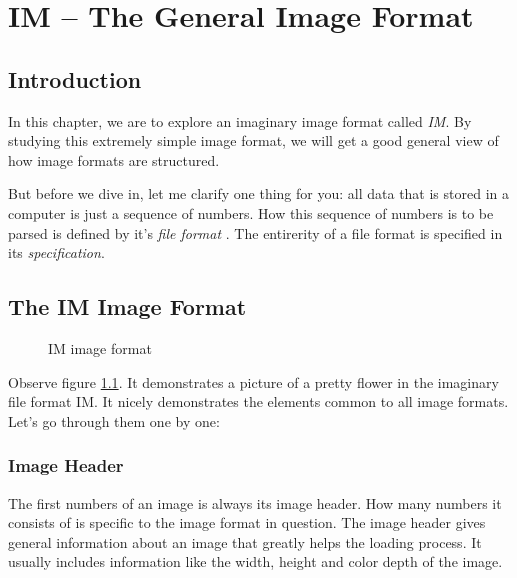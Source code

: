 \chapter{IM -- The General Image Format}
\label{cha:im}

\begin{refsection}

  \section{Introduction}
  \label{sec:introduction}

  In this chapter, we are to explore an imaginary image format called
  \textit{IM}. By studying this extremely simple image format, we will get a good
  general view of how image formats are structured.

  But before we dive in, let me clarify one thing for you: all data that
  is stored in a computer is just a sequence of numbers. How this
  sequence of numbers is to be parsed is defined by it's \textit{file
    format} . The entirerity of a file format is
  specified in its \textit{specification}.

  \section{The IM Image Format}
  \label{sec:general-image-format}

  \begin{figure}
    \centering
    \caption{IM image format}
    \label{fig:im}
  \end{figure}

  Observe figure \ref{fig:im}. It demonstrates a picture of a pretty
  flower in the imaginary file format IM. It nicely
  demonstrates the elements common to all image formats. Let's go
  through them one by one:

  \subsection{Image Header}
  \label{sec:image-header}

  The first numbers of an image is always its image header. How many numbers it consists of is specific to the image
  format in question. The image header gives general information about
  an image that greatly helps the loading process. It usually includes
  information like the width, height and color depth of the image.


\end{refsection}
